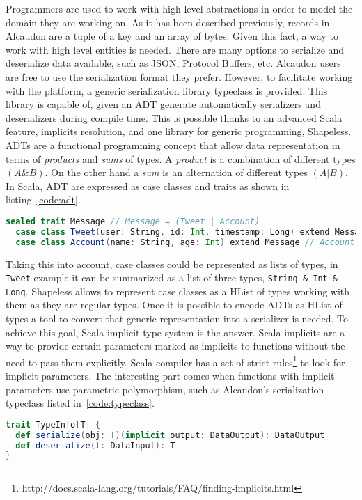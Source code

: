 Programmers are used to work with high level abstractions in order to model the
domain they are working on. As it has been described previously, records in
Alcaudon are a tuple of a key and an array of bytes. Given this fact, a way to
work with high level entities is needed. There are many options to serialize and
deserialize data available, such as JSON, Protocol Buffers, etc. Alcaudon users
are free to use the serialization format they prefer. However, to facilitate working
with the platform, a generic serialization library typeclass is provided. This
library is capable of, given an \acs{ADT} generate automatically serializers and
deserializers during compile time. This is possible thanks to an advanced Scala
feature, implicits resolution, and one library for generic programming,
Shapeless. \acs{ADT}s are a functional programming concept that allow data
representation in terms of \textit{products} and \textit{sums} of types. A
\textit{product} is a combination of different types $(A \& B)$. On the other
hand a \textit{sum} is an alternation of different types $(A | B)$. In Scala,
\acs{ADT} are expressed as case classes and traits as shown in
listing~\ref{code:adt}.

\begin{lstlisting}[language=scala, frame=trBL, label=code:adt, float=ht, caption = {\acs{ADT} example}]
  sealed trait Message // Message = (Tweet | Account)
  case class Tweet(user: String, id: Int, timestamp: Long) extend Message // Tweet = (String & Int & Long)
  case class Account(name: String, age: Int) extend Message // Account = (String & Int)
\end{lstlisting}

Taking this into account, case classes could be represented as lists of types,
in \lstinline[columns=fixed]{Tweet} example it can be summarized as a list of
three types, \lstinline[columns=fixed]{String & Int & Long}. Shapeless allows
to represent case classes as a \acf{HList} of types working with them
as they are regular types. Once it is possible to encode \acs{ADT}s as
\acs{HList} of types a tool to convert that generic representation into
a serializer is needed. To achieve this goal, Scala implicit type system is the
answer. Scala implicits are a way to provide certain parameters marked as
implicits to functions without the need to pass them explicitly. Scala compiler has
a set of strict rules\footnote{http://docs.scala-lang.org/tutorials/FAQ/finding-implicits.html}
to look for implicit parameters. The interesting part comes when functions with implicit
parameters use parametric polymorphism, such as Alcaudon's serialization typeclass
listed in~\ref{code:typeclass}.
\begin{lstlisting}[language=scala, frame=trBL, label=code:typeclass, float=ht, caption = {Serializer-Deserializer typeclass}]
trait TypeInfo[T] {
  def serialize(obj: T)(implicit output: DataOutput): DataOutput
  def deserialize(t: DataInput): T
}
\end{lstlisting}

